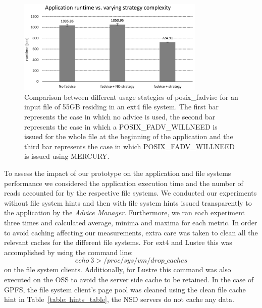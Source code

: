\begin{figure}[!htb]
  \centering
  \includegraphics[width=0.8\textwidth]{chapters/chapter2/figures/SC2015/ROOT/separate_plots/test_cluster/test_fadvise_no_border}
  \caption{Comparison between different usage stategies of posix\_fadvise for an input file of 55GB residing in an ext4 file system. The first bar represents the case in which no advice is used, the second bar represents the case in which a POSIX\_FADV\_WILLNEED is issued for the whole file at the beginning of the application and the third bar represents the case in which POSIX\_FADV\_WILLNEED is issued using MERCURY.}
  \label{figure: fadvise_comparison}
\end{figure} 
 
To assess the impact of our prototype on the application and file systems performance we considered the application execution time and the number of reads accounted for by the respective file systems. We conducted our experiments without file system hints and then with file system hints issued transparently to the application by the \textit{Advice Manager}. Furthermore, we ran each experiment three times and calculated average, minima and maxima for each metric. In order to avoid caching affecting our measurements, extra care was taken to clean all the relevant caches for the different file systems. For ext4 and Lustre this was accomplished by using the command line: $$echo\ 3 > /proc/sys/vm/drop\_caches$$ on the file system clients. Additionally, for Lustre this command was also executed on the OSS to avoid the server side cache to be retained. In the case of GPFS, the file system client's page pool was cleaned using the clean file cache hint in Table~\ref{table: hints_table}, the NSD servers do not cache any data. 

